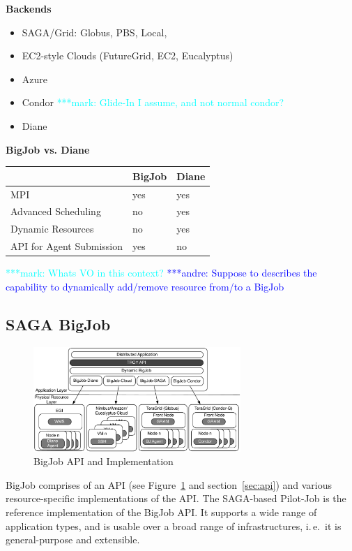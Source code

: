 \documentclass[]{article}
\newcommand{\alnote}[1]{ {\textcolor{blue} { ***andre: #1 }}}
\newcommand{\msnote}[1]{ {\textcolor{cyan} { ***mark: #1 }}}
\newcommand{\alnote}[1]{}
\begin{document}
		
\vspace{10 mm}

\textbf{Backends}
\begin{itemize}
    \item SAGA/Grid: Globus, PBS, Local, 
    \item EC2-style Clouds (FutureGrid, EC2, Eucalyptus)
    \item Azure
    \item Condor
    \msnote{Glide-In I assume, and not normal condor?}
    \item Diane
\end{itemize}


\textbf{BigJob vs. Diane}

\begin{tabular}{|l|l|l|}
\hline
 &BigJob &Diane\\
\hline
MPI &yes &yes\\
\hline
Advanced Scheduling &no &yes\\
\hline
Dynamic Resources &no &yes\\
\hline
API for Agent Submission &yes &no\\
\hline
\end{tabular}

\msnote{Whats VO in this context?}\alnote{Suppose to describes the capability to dynamically add/remove resource from/to a BigJob}


\subsection{SAGA BigJob}

\begin{figure}[t]
    \centering
        \includegraphics[width=0.7\textwidth]{figures/distributed_pilot_job.pdf}
    \caption{BigJob API and Implementation}
    \label{fig:figures_distributed_pilot_job}
\end{figure}

BigJob comprises of an API (see Figure~\ref{fig:figures_distributed_pilot_job}
and section~\ref{sec:api}) and various resource-specific implementations of the
API. The SAGA-based Pilot-Job is the reference implementation of the BigJob API.
It supports a wide range of application types, and is usable over a broad range
of infrastructures, i.\,e.\ it is general-purpose and extensible.
\end{document}
